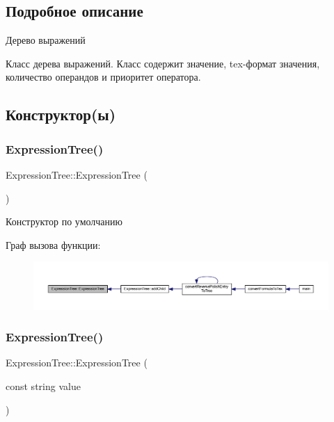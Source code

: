 \subsection{Подробное описание}
Дерево выражений 

Класс дерева выражений. Класс содержит значение, tex-\/формат значения, количество операндов и приоритет оператора. 

\subsection{Конструктор(ы)}
\mbox{\label{class_expression_tree_a0d743ee804cf5d9c792906f936151886}} 
\subsubsection{\texorpdfstring{Expression\+Tree()}{ExpressionTree()}\hspace{0.1cm}{\footnotesize\ttfamily [1/2]}}
{\footnotesize\ttfamily Expression\+Tree\+::\+Expression\+Tree (\begin{DoxyParamCaption}{ }\end{DoxyParamCaption})}



Конструктор по умолчанию 

Граф вызова функции\+:\nopagebreak
\begin{figure}[H]
\begin{center}
\leavevmode
\includegraphics[width=350pt]{class_expression_tree_a0d743ee804cf5d9c792906f936151886_icgraph}
\end{center}
\end{figure}
\mbox{\label{class_expression_tree_aa158e3eced2b61eedabec90ff8f62a3b}} 
\subsubsection{\texorpdfstring{Expression\+Tree()}{ExpressionTree()}\hspace{0.1cm}{\footnotesize\ttfamily [2/2]}}
{\footnotesize\ttfamily Expression\+Tree\+::\+Expression\+Tree (\begin{DoxyParamCaption}\item[{const string}]{value }\end{DoxyParamCaption})}



